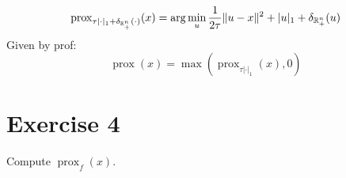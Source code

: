 \documentclass[12pt]{article}
\newcommand{\prox}{\operatorname{prox}}
\begin{document}
\begin{equation}
  \prox_{\tau |\cdot|_1 + \delta_{\R_+^n} (\cdot)}(x) = \arg\min_{u} \frac{1}{2\tau}\|u-x\|^2 + |u|_1 + \delta_{\R_+^n} (u)
\end{equation}
Given by prof:
\begin{equation}
  \prox(x) = \max(\prox_{\tau |\cdot|_1}(x), 0)
\end{equation}


\section{Exercise 4}
Compute $\prox_{f}(x)$.


\end{document}
